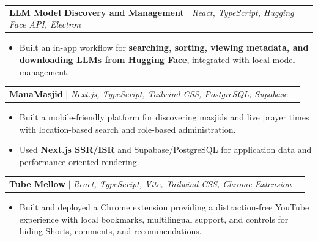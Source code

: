 \documentclass[letterpaper,11pt]{article}
\makeatletter
\newcommand{\resumeItem}[1]{
  \item\small{
    {#1 \vspace{-2pt}}
  }
}
\newcommand{\resumeProjectHeading}[2]{
    \item
    \begin{tabular*}{0.97\textwidth}{l@{\extracolsep{\fill}}r}
      \small#1 & #2 \\
    \end{tabular*}\vspace{-7pt}
}
\newcommand{\resumeItemListStart}{\begin{itemize}}
\newcommand{\resumeItemListEnd}{\end{itemize}\vspace{-5pt}}
\makeatother
\begin{document}
\resumeProjectHeading
{\textbf{LLM Model Discovery and Management} $|$ \emph{React, TypeScript, Hugging Face API, Electron}}{}
\resumeItemListStart
\resumeItem{Built an in-app workflow for \textbf{searching, sorting, viewing metadata, and downloading LLMs from Hugging Face}, integrated with local model management.}
\resumeItemListEnd

\resumeProjectHeading
{\textbf{ManaMasjid} $|$ \emph{Next.js, TypeScript, Tailwind CSS, PostgreSQL, Supabase}}{}
\resumeItemListStart
\resumeItem{Built a mobile-friendly platform for discovering masjids and live prayer times with location-based search and role-based administration.}
\resumeItem{Used \textbf{Next.js SSR/ISR} and Supabase/PostgreSQL for application data and performance-oriented rendering.}
\resumeItemListEnd

\resumeProjectHeading
{\textbf{Tube Mellow} $|$ \emph{React, TypeScript, Vite, Tailwind CSS, Chrome Extension}}{}
\resumeItemListStart
\resumeItem{Built and deployed a Chrome extension providing a distraction-free YouTube experience with local bookmarks, multilingual support, and controls for hiding Shorts, comments, and recommendations.}
\resumeItemListEnd
\end{document}
